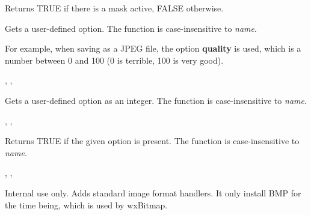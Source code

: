 

\label{wximagehasmask}


Returns TRUE if there is a mask active, FALSE otherwise.

\label{wximagegetoption}


Gets a user-defined option. The function is case-insensitive to {\it name}.

For example, when saving as a JPEG file, the option {\bf quality} is
used, which is a number between 0 and 100 (0 is terrible, 100 is very good).


,\rtfsp
{},\rtfsp
{}

\label{wximagegetoptionint}


Gets a user-defined option as an integer. The function is case-insensitive to {\it name}.


,\rtfsp
{},\rtfsp
{}

\label{wximagehasoption}


Returns TRUE if the given option is present. The function is case-insensitive to {\it name}.


,\rtfsp
{},\rtfsp
{}



Internal use only. Adds standard image format handlers. It only install BMP
for the time being, which is used by wxBitmap.

